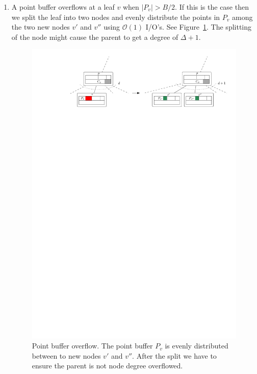\documentclass[twoside,11pt,openright]{report}
\begin{document}
\begin{enumerate}[label=(\roman*)]
	\item\label{update:pbo} A point buffer overflows at a leaf $v$ when $\vert P_v \vert > B/2$. If this is the case then we split the leaf into two nodes and evenly distribute the points in $P_v$ among the two new nodes $v'$ and $v''$ using $\mathcal{O}(1)$ I/O's. See Figure~\ref{fig:brodal_point_buffer_overflow}. The splitting of the node might cause the parent to get a degree of $\Delta+1$.
	
	\begin{figure}[h]
		\centering
		\includegraphics[width=1\textwidth]{../figures/brodal_point_buffer_overflow}
		\caption{Point buffer overflow. The point buffer $P_v$ is evenly distributed between to new nodes $v'$ and $v''$. After the split we have to ensure the parent is not node degree overflowed.}
		\label{fig:brodal_point_buffer_overflow}
	\end{figure}	
	

\end{enumerate}
\end{document}
